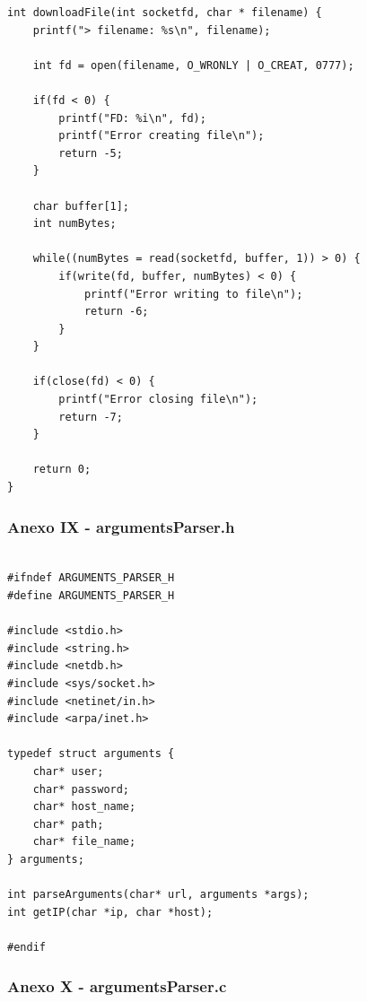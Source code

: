 \documentclass[11pt]{article}
\begin{document}
\begin{lstlisting}[style=CStyle]
int downloadFile(int socketfd, char * filename) {
    printf("> filename: %s\n", filename);

    int fd = open(filename, O_WRONLY | O_CREAT, 0777);

    if(fd < 0) {
        printf("FD: %i\n", fd);
        printf("Error creating file\n");
        return -5;
    }

    char buffer[1];
    int numBytes;

    while((numBytes = read(socketfd, buffer, 1)) > 0) {
        if(write(fd, buffer, numBytes) < 0) {
            printf("Error writing to file\n");
            return -6;
        }
    }

    if(close(fd) < 0) {
        printf("Error closing file\n");
        return -7;
    }

    return 0;
}

\end{lstlisting}

\pagebreak

\subsubsection{Anexo IX - argumentsParser.h}

\begin{lstlisting}[style=CStyle]

#ifndef ARGUMENTS_PARSER_H
#define ARGUMENTS_PARSER_H

#include <stdio.h>
#include <string.h>
#include <netdb.h> 
#include <sys/socket.h>
#include <netinet/in.h>
#include <arpa/inet.h>

typedef struct arguments {
    char* user;
    char* password;
    char* host_name;
    char* path;
    char* file_name;
} arguments;

int parseArguments(char* url, arguments *args);
int getIP(char *ip, char *host);

#endif

\end{lstlisting}

\subsubsection{Anexo X - argumentsParser.c}
\end{document}

